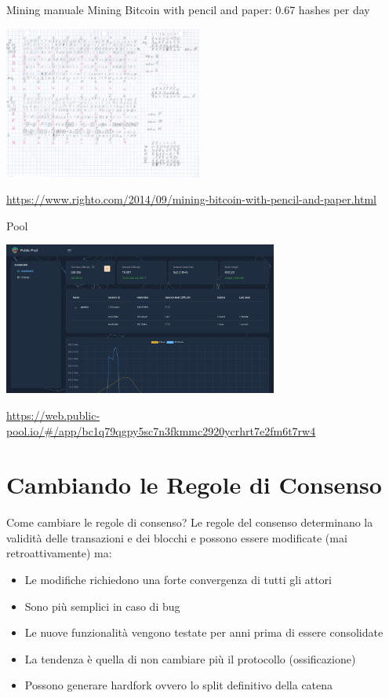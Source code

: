 \documentclass[aspectratio=169]{beamer}
\begin{document}
\begin{frame}{Mining manuale}
    Mining Bitcoin with pencil and paper: 0.67 hashes per day
    \begin{center}
        \includegraphics[height=5cm]{mining_manuale.png}
    \end{center}
    \url{https://www.righto.com/2014/09/mining-bitcoin-with-pencil-and-paper.html}
\end{frame}

\begin{frame}{Pool}
    \begin{center}
        \includegraphics[height=5cm]{pool.png}
    \end{center}
    \url{https://web.public-pool.io/#/app/bc1q79qgpy5sc7n3fkmmc2920ycrhrt7e2fm6t7rw4}
\end{frame}

\section{Cambiando le Regole di Consenso}

\begin{frame}{Come cambiare le regole di consenso?}
Le regole del consenso determinano la validità delle transazioni e dei blocchi e possono essere modificate (mai retroattivamente) ma:
\begin{itemize}
    \item Le modifiche richiedono una forte convergenza di tutti gli attori
    \item Sono più semplici in caso di bug
    \item Le nuove funzionalità vengono testate per anni prima di essere consolidate
    \item La tendenza è quella di non cambiare più il protocollo (ossificazione)
    \item Possono generare hardfork ovvero lo split definitivo della catena
\end{itemize}
\end{frame}
\end{document}
